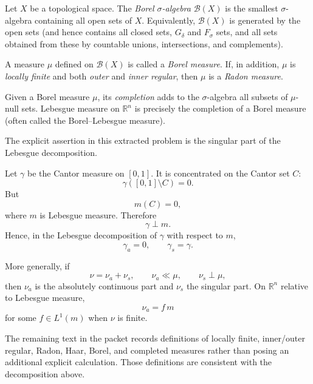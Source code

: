 \begin{problem}[CP-II-0309]
	Let $X$ be a topological space. The \emph{Borel $\sigma$-algebra} $\mathcal{B}(X)$
	is the smallest $\sigma$-algebra containing all open sets of $X$.
	Equivalently, $\mathcal{B}(X)$ is generated by the open sets (and hence contains
	all closed sets, $G_\delta$ and $F_\sigma$ sets, and all sets obtained from these
	by countable unions, intersections, and complements).

	\bigskip

	A measure $\mu$ defined on $\mathcal{B}(X)$ is called a \emph{Borel measure}.
	If, in addition, $\mu$ is \emph{locally finite} and both \emph{outer} and \emph{inner regular},
	then $\mu$ is a \emph{Radon measure}.

	\bigskip

	Given a Borel measure $\mu$, its \emph{completion} adds to the $\sigma$-algebra
	all subsets of $\mu$-null sets. Lebesgue measure on $\mathbb{R}^n$ is precisely
	the completion of a Borel measure (often called the Borel--Lebesgue measure).

	\bigskip
\end{problem}

\begin{solution}
The explicit assertion in this extracted problem is the singular part of the Lebesgue decomposition.

Let \(\gamma\) be the Cantor measure on \([0,1]\). It is concentrated on the Cantor set \(C\):
\[
\gamma([0,1]\setminus C)=0.
\]
But
\[
m(C)=0,
\]
where \(m\) is Lebesgue measure. Therefore
\[
\gamma\perp m.
\]
Hence, in the Lebesgue decomposition of \(\gamma\) with respect to \(m\),
\[
\boxed{
\gamma_a=0,
\qquad
\gamma_s=\gamma.
}
\]

More generally, if
\[
\nu=\nu_a+\nu_s,
\qquad
\nu_a\ll\mu,
\qquad
\nu_s\perp\mu,
\]
then \(\nu_a\) is the absolutely continuous part and \(\nu_s\) the singular part. On \(\mathbb R^n\) relative to Lebesgue measure,
\[
\nu_a=f\,m
\]
for some \(f\in L^1(m)\) when \(\nu\) is finite.

The remaining text in the packet records definitions of locally finite, inner/outer regular, Radon, Haar, Borel, and completed measures rather than posing an additional explicit calculation. Those definitions are consistent with the decomposition above.
\end{solution}


